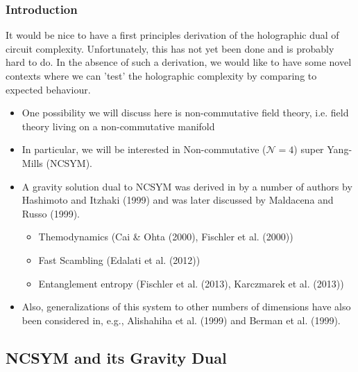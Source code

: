 \documentclass[8pt,aspectratio=169]{beamer}
\begin{document}
\begin{frame}
\frametitle{Introduction}

It would be nice to have a first principles derivation of the holographic dual of circuit complexity. Unfortunately, this has not yet been done and is probably hard to do. In the absence of such a derivation, we would like to have some novel contexts where we can 'test' the holographic complexity by comparing to expected behaviour.

\begin{itemize}

\item One possibility we will discuss here is non-commutative field theory, i.e. field theory living on a non-commutative manifold

\item In particular, we will be interested in Non-commutative ($\mathcal{N}=4$) super Yang-Mills (NCSYM).

\item A gravity solution dual to NCSYM was derived in by a number of authors by Hashimoto and Itzhaki (1999) and was later discussed by Maldacena and Russo (1999).


\begin{itemize}
		
	\item Themodynamics (Cai \& Ohta (2000), Fischler et al. (2000))
	\item Fast Scambling (Edalati et al. (2012))
	\item Entanglement entropy (Fischler et al. (2013), Karczmarek et al. (2013))
	
\end{itemize}

\item Also, generalizations of this system to other numbers of dimensions have also been considered in, e.g., Alishahiha et al. (1999) and Berman et al. (1999).

\end{itemize}

\end{frame}

\subsection{NCSYM and its Gravity Dual}
\end{document}
